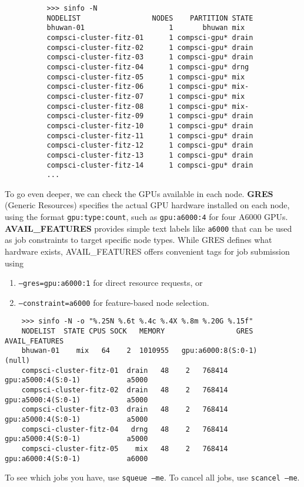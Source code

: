 \begin{definition}
\begin{enumerate}
        \begin{lstlisting}
          >>> sinfo -N     
          NODELIST                 NODES    PARTITION STATE 
          bhuwan-01                    1       bhuwan mix   
          compsci-cluster-fitz-01      1 compsci-gpu* drain 
          compsci-cluster-fitz-02      1 compsci-gpu* drain 
          compsci-cluster-fitz-03      1 compsci-gpu* drain 
          compsci-cluster-fitz-04      1 compsci-gpu* drng  
          compsci-cluster-fitz-05      1 compsci-gpu* mix   
          compsci-cluster-fitz-06      1 compsci-gpu* mix-  
          compsci-cluster-fitz-07      1 compsci-gpu* mix   
          compsci-cluster-fitz-08      1 compsci-gpu* mix-  
          compsci-cluster-fitz-09      1 compsci-gpu* drain 
          compsci-cluster-fitz-10      1 compsci-gpu* drain 
          compsci-cluster-fitz-11      1 compsci-gpu* drain 
          compsci-cluster-fitz-12      1 compsci-gpu* drain 
          compsci-cluster-fitz-13      1 compsci-gpu* drain 
          compsci-cluster-fitz-14      1 compsci-gpu* drain
          ...
        \end{lstlisting}
    \end{enumerate}
  \end{definition}

  To go even deeper, we can check the GPUs available in each node. \textbf{GRES} (Generic Resources) specifies the actual GPU hardware installed on each node, using the format \texttt{gpu:type:count}, such as \texttt{gpu:a6000:4} for four A6000 GPUs. \textbf{AVAIL\_FEATURES} provides simple text labels like \texttt{a6000} that can be used as job constraints to target specific node types. While GRES defines what hardware exists, AVAIL\_FEATURES offers convenient tags for job submission using 
  \begin{enumerate}
    \item \texttt{--gres=gpu:a6000:1} for direct resource requests, or
    \item \texttt{--constraint=a6000} for feature-based node selection.
  \end{enumerate}

  \begin{lstlisting}
    >>> sinfo -N -o "%.25N %.6t %.4c %.4X %.8m %.20G %.15f"
    NODELIST  STATE CPUS SOCK   MEMORY                 GRES  AVAIL_FEATURES
    bhuwan-01    mix   64    2  1010955   gpu:a6000:8(S:0-1)          (null)
    compsci-cluster-fitz-01  drain   48    2   768414   gpu:a5000:4(S:0-1)           a5000
    compsci-cluster-fitz-02  drain   48    2   768414   gpu:a5000:4(S:0-1)           a5000
    compsci-cluster-fitz-03  drain   48    2   768414   gpu:a5000:4(S:0-1)           a5000
    compsci-cluster-fitz-04   drng   48    2   768414   gpu:a5000:4(S:0-1)           a5000
    compsci-cluster-fitz-05    mix   48    2   768414   gpu:a6000:4(S:0-1)           a6000 
  \end{lstlisting}


  To see which jobs you have, use \texttt{squeue --me}. To cancel all jobs, use \texttt{scancel --me}. 
  
